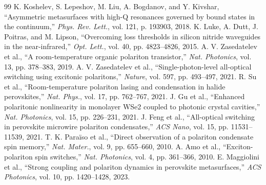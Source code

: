 \documentclass[11pt,a4paper]{article}
\begin{document}
\begin{thebibliography}{99}
 K. Koshelev, S. Lepeshov, M. Liu, A. Bogdanov, and Y. Kivshar, ``Asymmetric metasurfaces with high-Q resonances governed by bound states in the continuum,'' \textit{Phys. Rev. Lett.}, vol. 121, p. 193903, 2018.
 K. Luke, A. Dutt, J. Poitras, and M. Lipson, ``Overcoming loss thresholds in silicon nitride waveguides in the near-infrared,'' \textit{Opt. Lett.}, vol. 40, pp. 4823--4826, 2015.
 A. V. Zasedatelev et al., ``A room-temperature organic polariton transistor,'' \textit{Nat. Photonics}, vol. 13, pp. 378--383, 2019.
 A. V. Zasedatelev et al., ``Single-photon-level all-optical switching using excitonic polaritons,'' \textit{Nature}, vol. 597, pp. 493--497, 2021.
 R. Su et al., ``Room-temperature polariton lasing and condensation in halide perovskites,'' \textit{Nat. Phys.}, vol. 17, pp. 762--767, 2021.
 J. Gu et al., ``Enhanced polaritonic nonlinearity in monolayer WSe2 coupled to photonic crystal cavities,'' \textit{Nat. Photonics}, vol. 15, pp. 226--231, 2021.
 J. Feng et al., ``All-optical switching in perovskite microwire polariton condensates,'' \textit{ACS Nano}, vol. 15, pp. 11531--11539, 2021.
 T. K. Para\"iso et al., ``Direct observation of a polariton condensate spin memory,'' \textit{Nat. Mater.}, vol. 9, pp. 655--660, 2010.
 A. Amo et al., ``Exciton-polariton spin switches,'' \textit{Nat. Photonics}, vol. 4, pp. 361--366, 2010.
 E. Maggiolini et al., ``Strong coupling and polariton dynamics in perovskite metasurfaces,'' \textit{ACS Photonics}, vol. 10, pp. 1420--1428, 2023.
\end{thebibliography}
\end{document}
